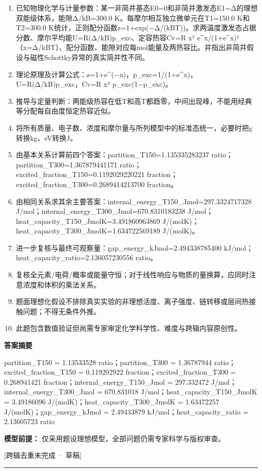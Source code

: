\documentclass[UTF8,11pt,a4paper]{ctexart}
\begin{document}
\begin{enumerate}
\item 已知物理化学与计量参数：某一非简并基态E0=0和非简并激发态E1=Δ的理想双能级体系，能隙Δ/kB=300.0 K。每摩尔相互独立微单元在T1=150.0 K和T2=300.0 K统计，正则配分函数z=1+exp(−Δ/(kBT))。求两温度激发态占据分数、摩尔平均能U=R(Δ/kB)p\_exc、定容热容Cv=R x² e\textasciicircum{}x/(1+e\textasciicircum{}x)²（x=Δ/kBT）、配分函数、能隙对应每mol能量及两热容比。并指出非简并假设与磁性Schottky异常的真实简并性不同。
\item 理论原理及计算公式：z=1+e\textasciicircum{}(−x)，p\_exc=1/(1+e\textasciicircum{}x)，U=R(Δ/kB)p\_exc，Cv=R x² p\_exc(1−p\_exc)。
\item 推导与定量判断：两能级热容在低T和高T都趋零，中间出现峰，不能用经典等分配每自由度恒定热容近似。
\item 将所有质量、电子数、浓度和摩尔量与所列模型中的标准态统一，必要时把g转换kg、eV转换J。
\item 由基本关系计算前四个答案：partition\_T150=1.135335283237 ratio；partition\_T300=1.367879441171 ratio；excited\_fraction\_T150=0.1192029220221 fraction；excited\_fraction\_T300=0.2689414213700 fraction。
\item 由相同关系求其余主要答案：internal\_energy\_T150\_Jmol=297.3324717328 J/mol；internal\_energy\_T300\_Jmol=670.8310183238 J/mol；heat\_capacity\_T150\_JmolK=3.491860963869 J/(molK)；heat\_capacity\_T300\_JmolK=1.634722569189 J/(molK)。
\item 进一步复核与最终可观察量：gap\_energy\_kJmol=2.494338785400 kJ/mol；heat\_capacity\_ratio=2.136057230556 ratio。
\item 复核全元素/电荷/概率或能量守恒；对于线性响应与物质的量换算，应同时注意浓度和体积的乘法关系。
\item 题面理想化假设不排除真实实验的非理想活度、离子强度、链转移或层间热接触问题；不得无条件外推。
\item 此题包含数值验证但尚需专家审定化学科学性、难度与跨辑内容原创性。
\end{enumerate}
\noindent\textbf{答案摘要}\par
partition\_T150 = 1.13533528 ratio；partition\_T300 = 1.36787944 ratio；excited\_fraction\_T150 = 0.119202922 fraction；excited\_fraction\_T300 = 0.268941421 fraction；internal\_energy\_T150\_Jmol = 297.332472 J/mol；internal\_energy\_T300\_Jmol = 670.831018 J/mol；heat\_capacity\_T150\_JmolK = 3.49186096 J/(molK)；heat\_capacity\_T300\_JmolK = 1.63472257 J/(molK)；gap\_energy\_kJmol = 2.49433879 kJ/mol；heat\_capacity\_ratio = 2.13605723 ratio\par
\noindent\textbf{模型前提：}
仅采用题设理想模型，全部问题仍需专家科学与版权审查。\par
\noindent\textcolor{red!65!black}{[跨辑去重未完成 · 草稿]} \par
\medskip\hrule\medskip
{}
\end{document}
